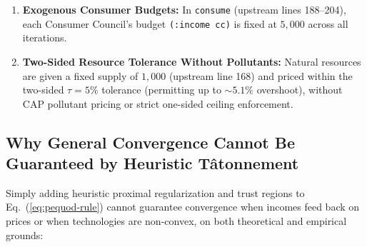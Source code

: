 \documentclass[10pt,twoside,openany]{book}
\theoremstyle{dpepstyle}
\begin{document}
\begin{enumerate}[leftmargin=1.8em,itemsep=2pt]
  \item \textbf{Exogenous Consumer Budgets:} In \texttt{consume} (upstream lines 188--204), each Consumer Council's budget \texttt{(:income cc)} is fixed at $5,000$ across all iterations.
  \item \textbf{Two-Sided Resource Tolerance Without Pollutants:} Natural resources are given a fixed supply of $1,000$ (upstream line 168) and priced within the two-sided $\tau = 5\%$ tolerance (permitting up to $\sim 5.1\%$ overshoot), without CAP pollutant pricing or strict one-sided ceiling enforcement.
\end{enumerate}

\subsection{Why General Convergence Cannot Be Guaranteed by Heuristic T\^atonnement}
\label{sec:convergence-limits}
Simply adding heuristic proximal regularization and trust regions to Eq.~(\ref{eq:pequod-rule}) cannot guarantee convergence when incomes feed back on prices or when technologies are non-convex, on both theoretical and empirical grounds:
\end{document}
